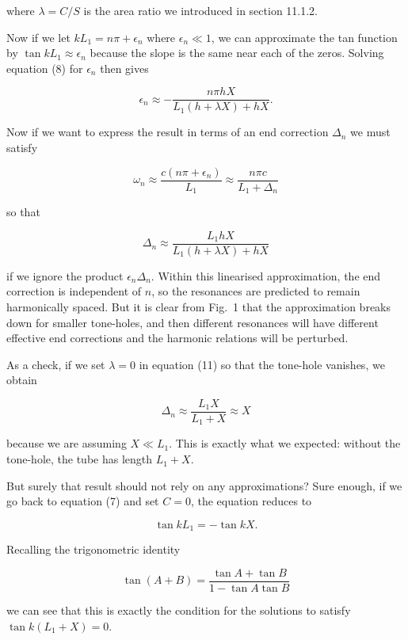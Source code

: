   where $\lambda = C/S$ is the area ratio we introduced in section 11.1.2. 

  Now if we let $kL_1=n\pi + \epsilon_n$ where $\epsilon_n \ll 1$, we can 
  approximate the tan function by $\tan kL_1 \approx \epsilon_n$ because the 
  slope is the same near each of the zeros. Solving equation (8) for 
  $\epsilon_n$ then gives 

  $$\epsilon_n \approx -\dfrac{n \pi h X}{L_1(h+\lambda X) +hX}. \tag{9}$$ 

  Now if we want to express the result in terms of an end correction $\Delta_n$ 
  we must satisfy 

  $$\omega_n \approx \frac{c(n \pi +\epsilon_n)}{L_1} \approx \dfrac{n \pi 
  c}{L_1 + \Delta_n} \tag{10}$$ 

  so that 

  $$\Delta_n \approx \dfrac{L_1 h X}{L_1(h+ \lambda X) +hX} \tag{11}$$ 

  if we ignore the product $\epsilon_n \Delta_n$. Within this linearised 
  approximation, the end correction is independent of $n$, so the resonances 
  are predicted to remain harmonically spaced. But it is clear from Fig.\ 1 
  that the approximation breaks down for smaller tone-holes, and then different 
  resonances will have different effective end corrections and the harmonic 
  relations will be perturbed. 

  As a check, if we set $\lambda = 0$ in equation (11) so that the tone-hole 
  vanishes, we obtain 

  $$\Delta_n \approx \dfrac{L_1 X}{L_1 + X} \approx X \tag{12}$$ 

  because we are assuming $X \ll L_1$. This is exactly what we expected: 
  without the tone-hole, the tube has length $L_1+X$. 

  But surely that result should not rely on any approximations? Sure enough, if 
  we go back to equation (7) and set $C=0$, the equation reduces to 

  $$\tan k L_1 =-\tan kX . \tag{13}$$ 

  Recalling the trigonometric identity 

  $$\tan(A+B)=\dfrac{\tan A + \tan B}{1-\tan A \tan B} \tag{14}$$ 

  we can see that this is exactly the condition for the solutions to satisfy 
  $\tan k(L_1+X)=0$. 